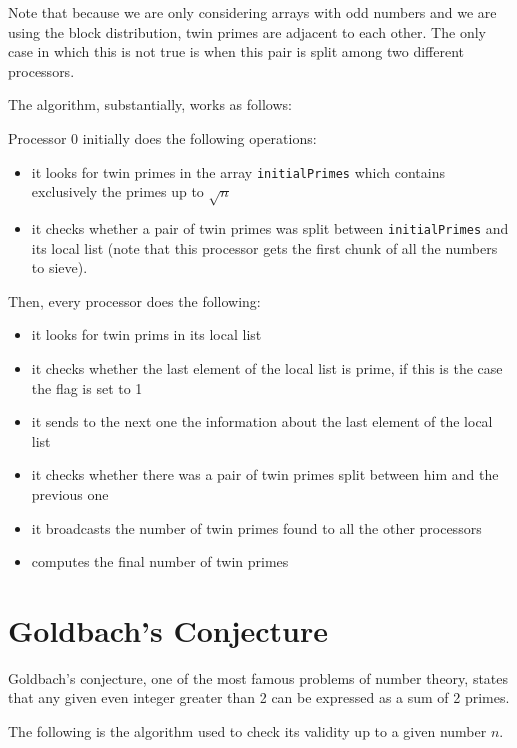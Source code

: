\documentclass[a4paper,11pt]{article}
\begin{document}
Note that because we are only considering arrays with odd numbers and we are using the block distribution, twin primes are adjacent to each other. The only case in which this is not true is when this pair is split among two different processors.

The algorithm, substantially, works as follows:

Processor 0 initially does the following operations:
\begin{itemize}
\item it looks for twin primes in the array \texttt{initialPrimes} which contains exclusively the primes up to $\sqrt{n}$
\item it checks whether a pair of twin primes was split between \texttt{initialPrimes} and its local list (note that this processor gets the first chunk of all the numbers to sieve).
\end{itemize}

Then, every processor does the following:
\begin{itemize}

\item it looks for twin prims in its local list
\item it checks whether the last element of the local list is prime, if this is the case the flag is set to 1
\item it sends to the next one the information about the last element of the local list
\item it checks whether there was a pair of twin primes split between him and the previous one
\item it broadcasts the number of twin primes found to all the other processors
\item computes the final number of twin primes
\end{itemize}

\section{Goldbach's Conjecture}
Goldbach's conjecture, one of the most famous problems of number theory, states that any given even integer greater than 2 can be expressed as a sum of 2 primes.

The following is the algorithm used to check its validity up to a given number $n$.
\end{document}

